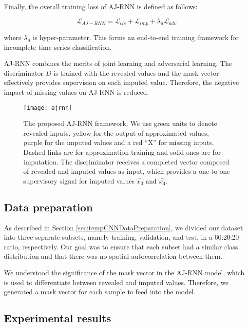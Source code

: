Finally, the overall training loss of AJ-RNN is defined as follows:

\begin{equation}
  \mathcal{L}_{AJ-RNN} = \mathcal{L}_{cls} + \mathcal{L}_{imp} + \lambda_d \mathcal{L}_{adv}
  \label{eq:AJRNNloss}
\end{equation}

where $\lambda_d$ is hyper-parameter. This forms an end-to-end
training framework for incomplete time series classification.

AJ-RNN combines the merits of joint learning and adversarial learning.
The discriminator $D$ is trained with the revealed values and the mask vector effectively provides supervision on each imputed value. 
Therefore, the negative impact of missing values on AJ-RNN is reduced.

\begin{figure}[ht]
  \centering
  \texttt{[image: ajrnn]}
  \caption{The proposed AJ-RNN framework. We use green units to denote revealed inputs, yellow for the output of approximated values, purple for
  the imputed values and a red “X” for missing inputs. Dashed links are for approximation training and solid ones are for imputation. The discriminator
  receives a completed vector composed of revealed and imputed values as input, which provides a one-to-one supervisory signal for imputed values
  $\hat{x_3}$ and $\hat{x_4}$. \cite{ajrnn}}
  \label{fig:AJRNNrchitecture}
\end{figure}

\subsection{Data preparation}
As described in Section \ref{sec:tempCNNDataPreparation}, we divided our dataset into three separate subsets, namely training, validation, and test, in a 60:20:20 ratio, respectively. 
Our goal was to ensure that each subset had a similar class distribution and that there was no spatial autocorrelation between them.

We understood the significance of the mask vector in the AJ-RNN model, which is used to differentiate between revealed and imputed values.
Therefore, we generated a mask vector for each sample to feed into the model.

\subsection{Experimental results}


